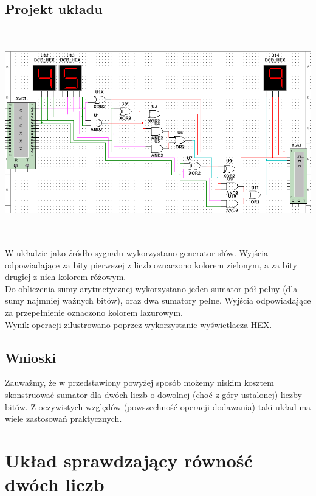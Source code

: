 \documentclass{article}
\begin{document}
        \subsection{Projekt układu}
            \begin{center}
                \includegraphics[height=9cm]{reports/img/Z1A_1.png}\\
            \end{center}
            W układzie jako źródło sygnału wykorzystano generator słów. Wyjścia odpowiadające za bity pierwszej z liczb oznaczono kolorem zielonym, a za bity drugiej z nich kolorem różowym. \\
            Do obliczenia sumy arytmetycznej wykorzystano jeden sumator pół-pełny (dla sumy najmniej ważnych bitów), oraz dwa sumatory pełne. Wyjścia odpowiadające za przepełnienie oznaczono kolorem lazurowym. \\
            Wynik operacji zilustrowano poprzez wykorzystanie wyświetlacza HEX. 
        
            
        \subsection{Wnioski}
            Zauważmy, że w przedstawiony powyżej sposób możemy niskim kosztem skonstruować sumator dla dwóch liczb o dowolnej (choć z góry ustalonej) liczby bitów. Z oczywistych względów (powszechność operacji dodawania) taki układ ma wiele zastosowań praktycznych. 
            
            
    \section{Układ sprawdzający równość dwóch liczb}
\end{document}
